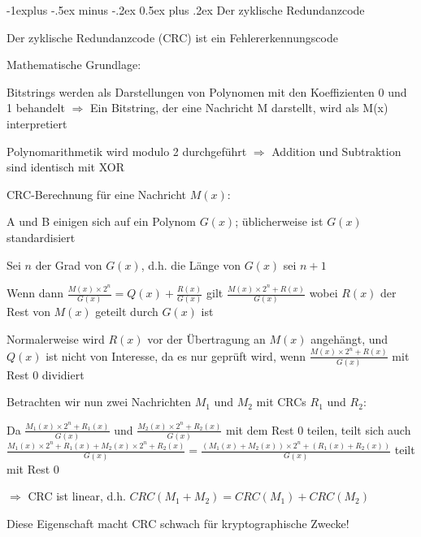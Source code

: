 \documentclass[a4paper]{article}
\makeatletter
\renewcommand{\subsection}{\@startsection{subsection}{2}{0mm}%
 {-1explus -.5ex minus -.2ex}%
 {0.5ex plus .2ex}%
 {\normalfont\normalsize\bfseries}}
\makeatother
\begin{document}
\begin{multicols}{3}
      \subsection{Der zyklische Redundanzcode}
      \begin{itemize*}
            \item Der zyklische Redundanzcode (CRC) ist ein Fehlererkennungscode
            \item Mathematische Grundlage:
            \begin{itemize*}
                  \item Bitstrings werden als Darstellungen von Polynomen mit den Koeffizienten 0 und 1 behandelt $\Rightarrow$ Ein Bitstring, der eine Nachricht M darstellt, wird als M(x) interpretiert
                  \item Polynomarithmetik wird modulo 2 durchgeführt $\Rightarrow$ Addition und Subtraktion sind identisch mit XOR
            \end{itemize*}
            \item CRC-Berechnung für eine Nachricht $M(x)$:
            \begin{itemize*}
                  \item A und B einigen sich auf ein Polynom $G(x)$; üblicherweise ist $G(x)$ standardisiert
                  \item Sei $n$ der Grad von $G(x)$, d.h. die Länge von $G(x)$ sei $n+1$
                  \item Wenn dann $\frac{M(x)\times 2^n}{G(x)}=Q(x)+\frac{R(x)}{G(x)}$ gilt $\frac{M(x)\times 2^n +R(x)}{G(x)}$ wobei $R(x)$ der Rest von $M(x)$ geteilt durch $G(x)$ ist
                  \item Normalerweise wird $R(x)$ vor der Übertragung an $M(x)$ angehängt, und $Q(x)$ ist nicht von Interesse, da es nur geprüft wird, wenn $\frac{M(x)\times 2^n+R(x)}{G(x)}$ mit Rest $0$ dividiert
            \end{itemize*}
            \item Betrachten wir nun zwei Nachrichten $M_1$ und $M_2$ mit CRCs $R_1$ und $R_2$:
            \begin{itemize*}
                  \item Da $\frac{M_1(x)\times 2^n+R_1(x)}{G(x)}$ und $\frac{M_2(x)\times 2^n+R_2(x)}{G(x)}$ mit dem Rest $0$ teilen, teilt sich auch $\frac{M_1(x)\times 2^n +R_1(x)+M_2(x)\times 2^n +R_2(x)}{G(x)} =\frac{(M_1(x)+M_2(x))\times 2^n +(R_1(x)+R_2(x))}{G(x)}$ teilt mit Rest $0$
                  \item $\Rightarrow$ CRC ist linear, d.h. $CRC(M_1 + M_2) = CRC(M_1) + CRC(M_2)$
            \end{itemize*}
            \item Diese Eigenschaft macht CRC schwach für kryptographische Zwecke!
      \end{itemize*}


\end{multicols}
\end{document}

